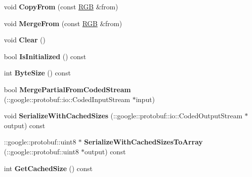 \begin{DoxyCompactItemize}
\item 
\hypertarget{classvss__state_1_1RGB_af67ab2848e2357d23f411c0df8bce782}{void {\bfseries Copy\-From} (const \hyperlink{classvss__state_1_1RGB}{R\-G\-B} \&from)}\label{classvss__state_1_1RGB_af67ab2848e2357d23f411c0df8bce782}

\item 
\hypertarget{classvss__state_1_1RGB_a168e56eb490d40877481d8a709ae8322}{void {\bfseries Merge\-From} (const \hyperlink{classvss__state_1_1RGB}{R\-G\-B} \&from)}\label{classvss__state_1_1RGB_a168e56eb490d40877481d8a709ae8322}

\item 
\hypertarget{classvss__state_1_1RGB_ad0c9a1848a43f2d89ebaa33d51ac6634}{void {\bfseries Clear} ()}\label{classvss__state_1_1RGB_ad0c9a1848a43f2d89ebaa33d51ac6634}

\item 
\hypertarget{classvss__state_1_1RGB_a0d2e0b5f89279b7553ef83d702f0bab8}{bool {\bfseries Is\-Initialized} () const }\label{classvss__state_1_1RGB_a0d2e0b5f89279b7553ef83d702f0bab8}

\item 
\hypertarget{classvss__state_1_1RGB_a2cd250a169ec6f47428b72537d384bcd}{int {\bfseries Byte\-Size} () const }\label{classvss__state_1_1RGB_a2cd250a169ec6f47428b72537d384bcd}

\item 
\hypertarget{classvss__state_1_1RGB_a2e6177a7e8c631c1f62a2d986fdfc452}{bool {\bfseries Merge\-Partial\-From\-Coded\-Stream} (\-::google\-::protobuf\-::io\-::\-Coded\-Input\-Stream $\ast$input)}\label{classvss__state_1_1RGB_a2e6177a7e8c631c1f62a2d986fdfc452}

\item 
\hypertarget{classvss__state_1_1RGB_ab16a3fd0ce7788dd974d078e445e7849}{void {\bfseries Serialize\-With\-Cached\-Sizes} (\-::google\-::protobuf\-::io\-::\-Coded\-Output\-Stream $\ast$output) const }\label{classvss__state_1_1RGB_ab16a3fd0ce7788dd974d078e445e7849}

\item 
\hypertarget{classvss__state_1_1RGB_a800b57f1540a265138517e52196cc70b}{\-::google\-::protobuf\-::uint8 $\ast$ {\bfseries Serialize\-With\-Cached\-Sizes\-To\-Array} (\-::google\-::protobuf\-::uint8 $\ast$output) const }\label{classvss__state_1_1RGB_a800b57f1540a265138517e52196cc70b}

\item 
\hypertarget{classvss__state_1_1RGB_a40f2c075e63a05d37dd4023cd25c61e6}{int {\bfseries Get\-Cached\-Size} () const }\label{classvss__state_1_1RGB_a40f2c075e63a05d37dd4023cd25c61e6}


\end{DoxyCompactItemize}
